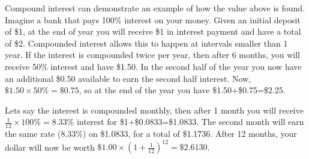 Compound interest can demonstrate an example of  how the value above is found. Imagine a bank that pays 100\% interest on your money. Given an initial deposit of \$1, at the end of year you will receive \$1 in interest payment and have a total of \$2. Compounded interest allows this to happen at intervals smaller than 1 year. If the interest is compounded twice per year, then after 6 months, you will receive 50\% interest and have \$1.50. In the second half of the year you now have an additional \$0.50 available to earn the second half interest. Now, $\$1.50\times50\%=\$0.75$, so at the end of the year you have \$1.50+\$0.75=\$2.25.

Lets say the interest is compounded monthly, then after 1 month you will receive $\frac{1}{12}\times 100\%=8.33\%$ interest for \$1+\$0.0833=\$1.0833. The second month will earn the same rate (8.33\%) on \$1.0833, for a total of \$1.1736. After 12 months, your dollar will now be worth $\$1.00\times\left(1+\frac{1}{12}\right)^{12}=\$2.6130$. 

